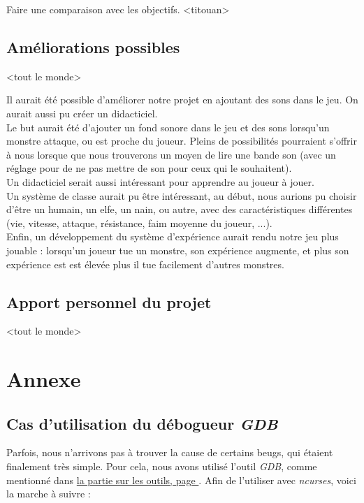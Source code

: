 \documentclass[11pt]{report}
\begin{document}
	Faire une comparaison avec les objectifs. <titouan>
	
	\section{Améliorations possibles}
	
	<tout le monde>
	
	Il aurait été possible d'améliorer notre projet en ajoutant des sons dans le jeu. On aurait aussi pu créer un didacticiel. \\
	Le but aurait été d'ajouter un fond sonore dans le jeu et des sons lorsqu'un monstre attaque, ou est proche du joueur. Pleins de possibilités pourraient s'offrir à nous lorsque que nous trouverons un moyen de lire une bande son (avec un réglage pour de ne pas mettre de son pour ceux qui le souhaitent). \\
	Un didacticiel serait aussi intéressant pour apprendre au joueur à jouer.\\
	Un système de classe aurait pu être intéressant, au début, nous aurions pu choisir d'être un humain, un elfe, un nain, ou autre, avec des caractéristiques différentes (vie, vitesse, attaque, résistance, faim moyenne du joueur, ...).\\
	Enfin, un développement du système d'expérience aurait rendu notre jeu plus jouable : lorsqu'un joueur tue un monstre, son expérience augmente, et plus son expérience est est élevée plus il tue facilement d'autres monstres.
	
	\section{Apport personnel du projet}
	
	<tout le monde>

\chapter*{Annexe}

	\section{Cas d'utilisation du débogueur \emph{GDB}}
	
		Parfois, nous n'arrivons pas à trouver la cause de certains beugs, qui étaient finalement très simple. Pour cela, nous avons utilisé l'outil \emph{GDB}, comme mentionné dans \hyperref[gdb]{la partie sur les outils, page }. Afin de l'utiliser avec \emph{ncurses}, voici la marche à suivre :
		
\end{document}
